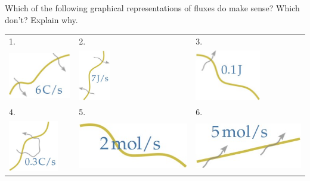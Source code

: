 \documentclass[a4paper,12pt,%
onecolumn,oneside,%
british%
]{memoir}
\renewcommand*{\|}[1][]{\nonscript\:#1\vert\nonscript\:\mathopen{}}
\begin{document}
\section{}
\label{sec:fluxes_scalar}

\renewcommand{\tabularxcolumn}[1]{>{\bfseries}w{c}{0.3\linewidth}}
Which of the following graphical representations of fluxes do make sense? Which don't? Explain why.\noprelistbreak

\begin{tabularx}{\linewidth}[h]{XXX}
1.&2.&3.
\\
  \includegraphics[align=c, height=6em,width=0.25\linewidth,keepaspectratio]{images/flux_scalar_1.jpg}
&  \includegraphics[align=c, height=6em,width=0.25\linewidth,keepaspectratio]{images/flux_scalar_2.jpg}
&  \includegraphics[align=c,height=6em,width=0.25\linewidth,keepaspectratio]{images/flux_scalar_4.jpg}
\\[10ex]
4.&5.&6.
\\
  \includegraphics[align=c, height=6em,width=0.25\linewidth,keepaspectratio]{images/flux_scalar_5.jpg}
&  \includegraphics[align=c, height=6em,width=0.25\linewidth,keepaspectratio]{images/flux_scalar_6.jpg}
&  \includegraphics[align=c, height=6em,width=0.25\linewidth,keepaspectratio]{images/flux_scalar_7.jpg}

\end{tabularx}
\end{document}
